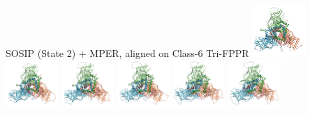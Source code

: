 \begin{frame}[fragile]{SOSIP (State 2) + MPER, aligned on Class-6 Tri-FPPR}
    \includegraphics[width=0.149\textwidth]{ppt/media/image1.png}
    \includegraphics[width=0.149\textwidth]{ppt/media/image2.png}
    \includegraphics[width=0.149\textwidth]{ppt/media/image3.png}
    \includegraphics[width=0.149\textwidth]{ppt/media/image4.png}
    \includegraphics[width=0.149\textwidth]{ppt/media/image10.png}
    \includegraphics[width=0.149\textwidth]{ppt/media/image12.png}

\end{frame}

